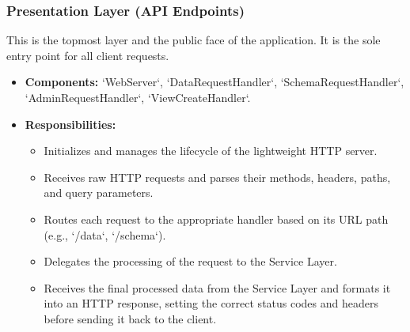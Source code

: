 \documentclass[12pt, a4paper]{report}
\begin{document}
\subsubsection{Presentation Layer (API Endpoints)}
This is the topmost layer and the public face of the application. It is the sole entry point for all client requests.
\begin{itemize}
    \item \textbf{Components:} `WebServer`, `DataRequestHandler`, `SchemaRequestHandler`, `AdminRequestHandler`, `ViewCreateHandler`.
    \item \textbf{Responsibilities:}
        \begin{itemize}
            \item Initializes and manages the lifecycle of the lightweight HTTP server.
            \item Receives raw HTTP requests and parses their methods, headers, paths, and query parameters.
            \item Routes each request to the appropriate handler based on its URL path (e.g., `/data`, `/schema`).
            \item Delegates the processing of the request to the Service Layer.
            \item Receives the final processed data from the Service Layer and formats it into an HTTP response, setting the correct status codes and headers before sending it back to the client.
        \end{itemize}
\end{itemize}
\end{document}
